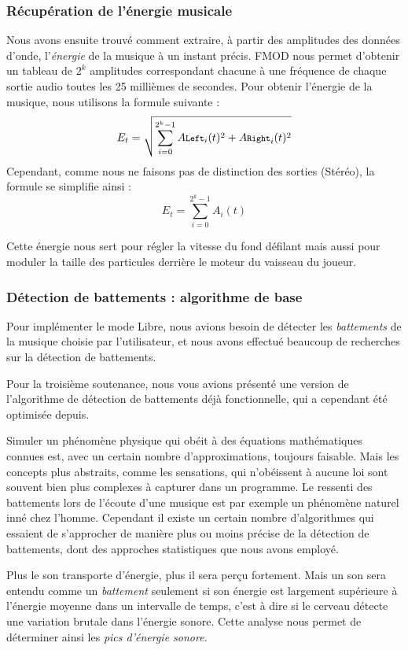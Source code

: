 \subsubsection{Récupération de l'énergie musicale}
Nous avons ensuite trouvé comment extraire, à partir des amplitudes des données d'onde, l'\emph{énergie} de la musique à un instant précis.
FMOD nous permet d'obtenir un tableau de $2^k$ amplitudes correspondant chacune à une fréquence de chaque sortie audio toutes les 25 millièmes de secondes. Pour obtenir l'énergie de la musique, nous utilisons la formule suivante :
$$E_t = \sqrt{\sum_{i=0}^{2^k - 1} A\footnotesize{\texttt{Left}}_i(t)^2 + A\footnotesize{\texttt{Right}}_i(t)^2}$$
Cependant, comme nous ne faisons pas de distinction des sorties (Stéréo), la formule se simplifie ainsi :
$$E_t = \sum_{i=0}^{2^k - 1} A_i(t)$$

Cette énergie nous sert pour régler la vitesse du fond défilant mais aussi pour moduler la taille des particules
derrière le moteur du vaisseau du joueur.

\subsubsection{Détection de battements : algorithme de base}

\par Pour implémenter le mode Libre, nous avions besoin de détecter les \emph{battements} de la musique choisie par l'utilisateur, et nous avons effectué beaucoup de recherches sur la détection de battements.

\par Pour la troisième soutenance, nous vous avions présenté une version de l'algorithme de détection de battements déjà fonctionnelle, qui a cependant été optimisée depuis.
	
\par Simuler un phénomène physique qui obéit à des équations mathématiques connues est, avec un certain nombre d'approximations, toujours faisable. Mais les concepts plus abstraits, comme les sensations, qui n'obéissent à aucune loi sont souvent bien plus complexes à capturer dans un programme. Le ressenti des battements lors de l'écoute d'une musique est par exemple un phénomène naturel inné chez l'homme. Cependant il existe un certain nombre d'algorithmes qui essaient de s'approcher de manière plus ou moins précise de la détection de battements, dont des approches statistiques que nous avons employé.
\par Plus le son transporte d'énergie, plus il sera perçu fortement. Mais un son sera entendu comme un \emph{battement} seulement si son énergie est largement supérieure à l'énergie moyenne dans un intervalle de temps, c'est à dire si le cerveau détecte une variation brutale dans l'énergie sonore. Cette analyse nous permet de déterminer ainsi les \emph{pics d'énergie sonore}.

